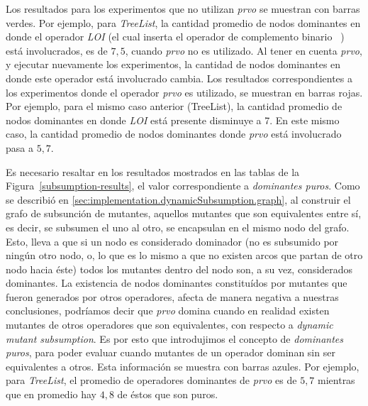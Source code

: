 Los resultados para los experimentos que no utilizan \emph{prvo} se muestran con barras verdes. Por ejemplo, para \emph{TreeList}, la cantidad promedio de nodos dominantes en donde el operador \emph{LOI} (el cual inserta el operador de complemento binario \emph{~}) est\'a involucrados, es de $7,5$, cuando \emph{prvo} no es utilizado. Al tener en cuenta \emph{prvo}, y ejecutar nuevamente los experimentos, la cantidad de nodos dominantes en donde este operador est\'a involucrado cambia. Los resultados correspondientes a los experimentos donde el operador \emph{prvo} es utilizado, se muestran en barras rojas. Por ejemplo, para el mismo caso anterior (TreeList), la cantidad promedio de nodos dominantes en donde \emph{LOI} est\'a presente disminuye a 7. En este mismo caso, la cantidad promedio de nodos dominantes donde \emph{prvo} est\'a involucrado pasa a $5,7$.

Es necesario resaltar en los resultados mostrados en las tablas de la Figura~\ref{subsumption-results}, el valor correspondiente a \emph{dominantes puros}. Como se describi\'o en \ref{sec:implementation.dynamicSubsumption.graph}, al construir el grafo de subsunci\'on de mutantes, aquellos mutantes que son equivalentes entre s\'i, es decir, se subsumen el uno al otro, se encapsulan en el mismo nodo del grafo. Esto, lleva a que si un nodo es considerado dominador (no es subsumido por ning\'un otro nodo, o, lo que es lo mismo a que no existen arcos que partan de otro nodo hacia \'este) todos los mutantes dentro del nodo son, a su vez, considerados dominantes. La existencia de nodos dominantes constitu\'idos por mutantes que fueron generados por otros operadores, afecta de manera negativa a nuestras conclusiones, podr\'iamos decir que \emph{prvo} domina cuando en realidad existen mutantes de otros operadores que son equivalentes, con respecto a \emph{dynamic mutant subsumption}. Es por esto que introdujimos el concepto de \emph{dominantes puros}, para poder evaluar cuando mutantes de un operador dominan sin ser equivalentes a otros. Esta informaci\'on se muestra con barras azules. Por ejemplo, para \emph{TreeList}, el promedio de operadores dominantes de \emph{prvo} es de $5,7$ mientras que en promedio hay $4,8$ de \'estos que son puros.

